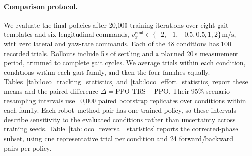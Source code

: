 \paragraph{Comparison protocol.}
We evaluate the final policies after 20,000 training iterations over eight gait templates and six longitudinal commands, $v_x^{\mathrm{cmd}}\in\{-2,-1,-0.5,0.5,1,2\}\,\mathrm{m/s}$, with zero lateral and yaw-rate commands. Each of the 48 conditions has 100 recorded trials. Rollouts include 5\,s of settling and a planned 20\,s measurement period, trimmed to complete gait cycles. We average trials within each condition, conditions within each gait family, and then the four families equally. Tables~\ref{tab:loco_tracking_statistics} and~\ref{tab:loco_effort_statistics} report these means and the paired difference $\Delta=\mathrm{PPO\mbox{-}TRS}-\mathrm{PPO}$. Their 95\% scenario-resampling intervals use 10,000 paired bootstrap replicates over conditions within each family. Each robot--method pair has one trained policy, so these intervals describe sensitivity to the evaluated conditions rather than uncertainty across training seeds. Table~\ref{tab:loco_reversal_statistics} reports the corrected-phase subset, using one representative trial per condition and 24 forward/backward pairs per policy.

